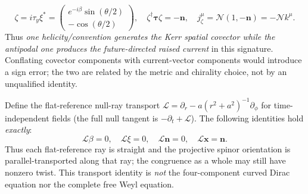 \documentclass[11pt,a4paper]{article}
\begin{document}
\begin{equation}\label{eq:v12-helicity}
\zeta=i\tau_y\xi^*=\begin{pmatrix}e^{-i\beta}\sin(\theta/2)\\-\cos(\theta/2)\end{pmatrix},\quad
\zeta^\dagger\boldsymbol\tau\zeta=-\boldsymbol n,\quad
j^\mu_\zeta=\mathcal N(1,-\boldsymbol n)=-\mathcal N k^\mu.
\end{equation}
Thus \emph{one helicity/convention generates the Kerr spatial covector while the antipodal one produces the future-directed raised current} in this signature. Conflating covector components with current-vector components would introduce a sign error; the two are related by the metric and chirality choice, not by an unqualified identity.

Define the flat-reference null-ray transport $\mathcal L=\partial_r-a(r^2+a^2)^{-1}\partial_\phi$ for time-independent fields (the full null tangent is $-\partial_t+\mathcal L$). The following identities hold \emph{exactly}:
\begin{equation}\label{eq:v12-transport}
\boxed{\mathcal L\beta=0,\quad \mathcal L\xi=0,\quad
\mathcal L\boldsymbol n=0,\quad
\mathcal L\boldsymbol x=\boldsymbol n.}
\end{equation}
Thus each flat-reference ray is straight and the projective spinor orientation is parallel-transported along that ray; the congruence as a whole may still have nonzero twist. This transport identity is \emph{not} the four-component curved Dirac equation nor the complete free Weyl equation.
\end{document}
